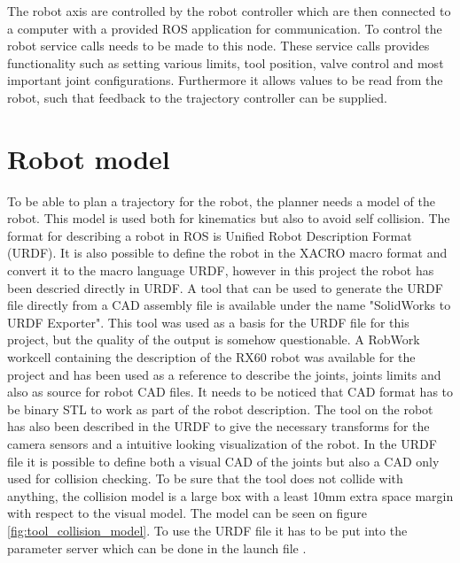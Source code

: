 
The robot axis are controlled by the robot controller which are then connected to a computer with a provided ROS application for communication. To control the robot service calls needs to be made to this node. These service calls provides functionality such as setting various limits, tool position, valve control and most important joint configurations. Furthermore it allows values to be read from the robot, such that feedback to the trajectory controller can be supplied.

\section{Robot model}
\label{sec:robot_model}
To be able to plan a trajectory for the robot, the planner needs a model of the robot. This model is used both for kinematics but also to avoid self collision. The format for describing a robot in ROS is Unified Robot Description Format (URDF). It is also possible to define the robot in the XACRO macro format and convert it to the macro language URDF, however in this project the robot has been descried directly in URDF.
A tool that can be used to generate the URDF file directly from a CAD assembly file is available under the name "SolidWorks to URDF Exporter". This tool was used as a basis for the URDF file for this project, but the quality of the output is somehow questionable. A RobWork workcell containing the description of the RX60 robot was available for the project and has been used as a reference to describe the joints, joints limits and also as source for robot CAD files. It needs to be noticed that CAD format has to be binary STL to work as part of the robot description. The tool on the robot has also been described in the URDF to give the necessary transforms for the camera sensors and a intuitive looking visualization of the robot. In the URDF file it is possible to define both a visual CAD of the joints but also a CAD only used for collision checking. To be sure that the tool does not collide with anything, the collision model is a large box with a least 10mm extra space margin with respect to the visual model. The model can be seen on figure \ref{fig:tool_collision_model}. To use the URDF file it has to be put into the parameter server which can be done in the launch file .

